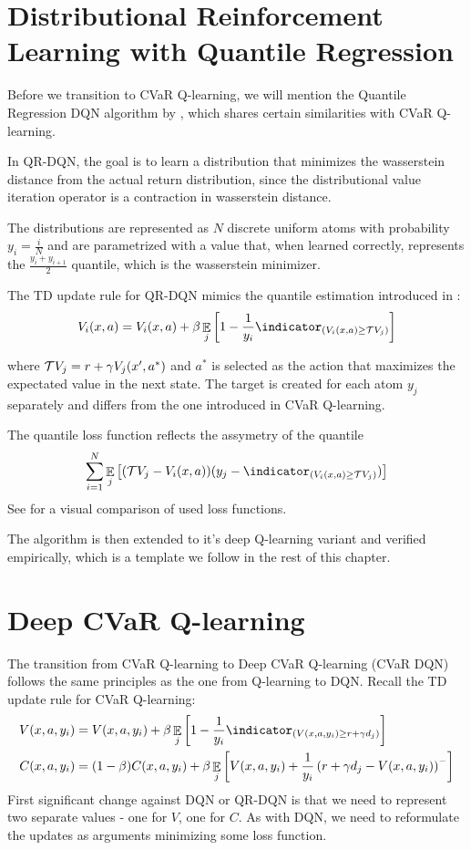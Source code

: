 \section{Distributional Reinforcement Learning with Quantile Regression}
Before we transition to CVaR Q-learning, we will mention the Quantile Regression DQN algorithm by \citet{dabney2017distributional}, which shares certain similarities with CVaR Q-learning.

In QR-DQN, the goal is to learn a distribution that minimizes the wasserstein distance from the actual return distribution, since the distributional value iteration operator is a contraction in wasserstein distance. 

The distributions are represented as $N$ discrete uniform atoms with probability $y_i = \frac{i}{N}$ and are parametrized with a value that, when learned correctly, represents the $\frac{y_{i}+y_{i+1}}{2}$ quantile, which is the wasserstein minimizer.

The TD update rule for QR-DQN mimics the quantile estimation introduced in :
\begin{equation*}
V_i(x, a) = V_i(x, a) + \beta \expect_j\bsquare{1-\dfrac{1}{y_i}\indicator_{(V_i(x, a) \ge \cT V_j)}}
\end{equation*}

where $\mathcal{T} V_j = r + \gamma V_j(x', a^*)$ and $a^*$ is selected as the action that maximizes the expectated value in the next state. The target is created for each atom $y_j$ separately and differs from the one introduced in CVaR Q-learning.

The quantile loss function reflects the assymetry of the quantile
\begin{equation}
\sum_{i=1}^{N} \expect_j\bsquare{(\cT V_j - V_i(x, a))(y_j - \indicator_{(V_i(x, a) \ge \cT V_j)})}
\end{equation}
See  for a visual comparison of used loss functions.

The algorithm is then extended to it's deep Q-learning variant and verified empirically, which is a template we follow in the rest of this chapter.

\section{Deep CVaR Q-learning}
The transition from CVaR Q-learning to Deep CVaR Q-learning (CVaR DQN) follows the same principles as the one from Q-learning to DQN. Recall the TD update rule for CVaR Q-learning:
\begin{align*}
V(x, a, y_i) &= V(x, a, y_i) + \beta \expect_j\bsquare{1 - \dfrac{1}{y_i}\indicator_{(V(x, a, y_i) \ge r+\gamma d_j)}}\\
C(x, a, y_i) &= (1-\beta)C(x, a, y_i) + \beta\expect_j\bsquare{V(x, a, y_i) + \dfrac{1}{y_i}\bround{r+\gamma d_j - V(x, a, y_i)}^-}
\end{align*}
First significant change against DQN or QR-DQN is that we need to represent two separate values - one for $V$, one for $C$. As with DQN, we need to reformulate the updates as arguments minimizing some loss function.

